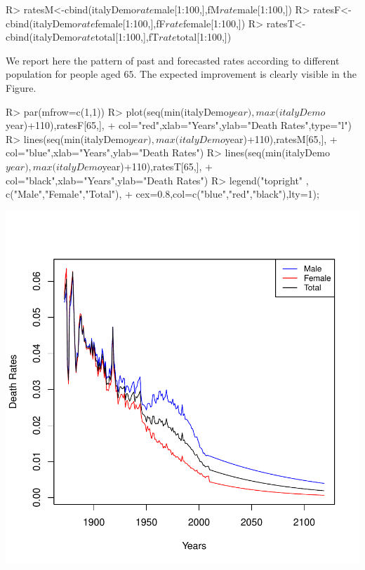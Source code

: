 \documentclass[nojss]{jss}
\begin{document}
\begin{Schunk}
\begin{Sinput}
R> ratesM<-cbind(italyDemo$rate$male[1:100,],fM$rate$male[1:100,])
R> ratesF<-cbind(italyDemo$rate$female[1:100,],fF$rate$female[1:100,])
R> ratesT<-cbind(italyDemo$rate$total[1:100,],fT$rate$total[1:100,])
\end{Sinput}
\end{Schunk}
We report here the pattern of past and forecasted rates according to different population for people aged $65$. The expected improvement is clearly visible in the Figure.

\begin{Schunk}
\begin{Sinput}
R> par(mfrow=c(1,1))
R> plot(seq(min(italyDemo$year),max(italyDemo$year)+110),ratesF[65,],
+      col="red",xlab="Years",ylab="Death Rates",type="l")
R> lines(seq(min(italyDemo$year),max(italyDemo$year)+110),ratesM[65,],
+       col="blue",xlab="Years",ylab="Death Rates")
R> lines(seq(min(italyDemo$year),max(italyDemo$year)+110),ratesT[65,],
+       col="black",xlab="Years",ylab="Death Rates")
R> legend("topright" , c("Male","Female","Total"),
+        cex=0.8,col=c("blue","red","black"),lty=1);
\end{Sinput}
\end{Schunk}
\includegraphics{mortality_projection-ktratesFig}
\end{document}
